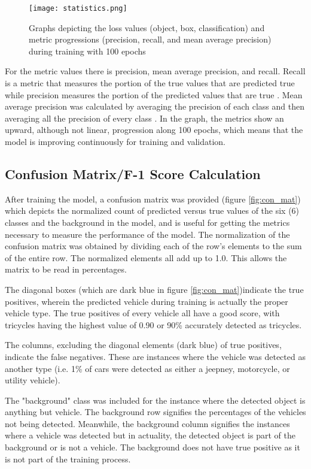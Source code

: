 \begin{figure}[!htbp]
	\texttt{[image: statistics.png]}
	\caption{Graphs depicting the loss values (object, box, classification) and metric progressions (precision, recall, and mean average precision) during training with 100 epochs}
	\label{fig:graph}
\end{figure}
\FloatBarrier

For the metric values there is precision, mean average precision, and recall. Recall is a metric that measures the portion of the true values that are predicted true while precision measures the portion of the predicted values that are true \cite{D_Powers}. Mean average precision was calculated by averaging the precision of each class and then averaging all the precision of every class \cite{Shah_2022}. In the graph, the metrics show an upward, although not linear, progression along 100 epochs, which means that the model is improving continuously for training and validation. 
 

\subsection{Confusion Matrix/F-1 Score Calculation}
After training the model, a confusion matrix was provided (figure \ref{fig:con_mat}) which depicts the normalized count of predicted versus true values of the six (6) classes and the background in the model, and is useful for getting the metrics necessary to measure the performance of the model.
The normalization of the confusion matrix was obtained by dividing each of the row's elements to the sum of the entire row. The normalized elements all add up to 1.0. This allows the matrix to be read in percentages.

The diagonal boxes (which are dark blue in figure \ref{fig:con_mat})indicate the true positives, wherein the predicted vehicle during training is actually the proper vehicle type. The true positives of every vehicle all have a good score, with tricycles having the highest value of 0.90 or 90\% accurately detected as tricycles. 

The columns, excluding the diagonal elements (dark blue) of true positives, indicate the false negatives. These are instances where the vehicle was detected as another type (i.e. 1\% of cars were detected as either a jeepney, motorcycle, or utility vehicle).

The "background" class was included for the instance where the detected object is anything but vehicle. The background row signifies the percentages of the vehicles not being detected. Meanwhile, the background column signifies the instances where a vehicle was detected but in actuality, the detected object is part of the background or is not a vehicle. The background does not have true positive as it is not part of the training process.


